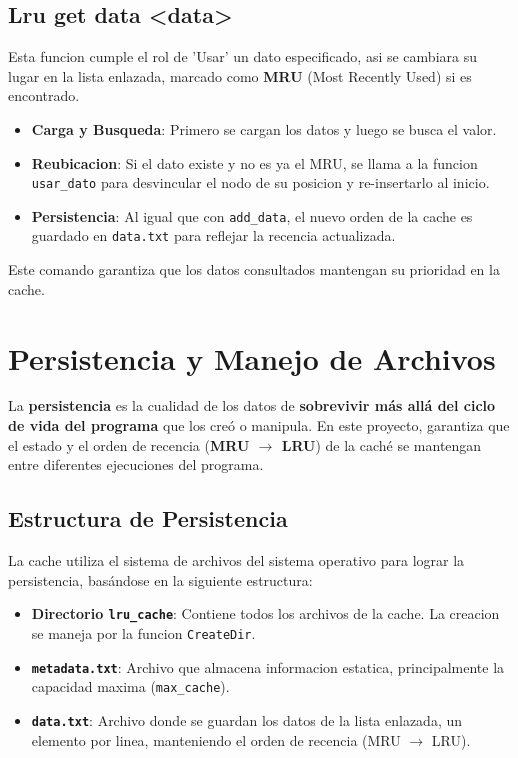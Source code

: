     \subsection{Lru get data \textless data\textgreater}
    Esta funcion cumple el rol de 'Usar' un dato especificado, asi se cambiara su lugar en la lista enlazada, marcado como \textbf{MRU} (Most Recently Used) si es encontrado. 
    \begin{itemize}
        \item \textbf{Carga y Busqueda}: Primero se cargan los datos y luego se busca el valor.
        \item \textbf{Reubicacion}: Si el dato existe y no es ya el MRU, se llama a la funcion \texttt{usar\_dato} para desvincular el nodo de su posicion y re-insertarlo al inicio.
        \item \textbf{Persistencia}: Al igual que con \texttt{add\_data}, el nuevo orden de la cache es guardado en \texttt{data.txt} para reflejar la recencia actualizada.
    \end{itemize}
    Este comando garantiza que los datos consultados mantengan su prioridad en la cache.
\newpage
\section{Persistencia y Manejo de Archivos}
    La \textbf{persistencia} es la cualidad de los datos de \textbf{sobrevivir más allá del ciclo de vida del programa} que los creó o manipula. En este proyecto, 
    garantiza que el estado y el orden de recencia (\textbf{MRU $\rightarrow$ LRU}) de la caché se mantengan entre diferentes ejecuciones del programa.
    \subsection{Estructura de Persistencia}
    La cache utiliza el sistema de archivos del sistema operativo para lograr la persistencia, basándose en la siguiente estructura:
    \begin{itemize}
        \item \textbf{Directorio \texttt{lru\_cache}}: Contiene todos los archivos de la cache. La creacion se maneja por la funcion \texttt{CreateDir}.
        \item \textbf{\texttt{metadata.txt}}: Archivo que almacena informacion estatica, principalmente la capacidad maxima (\texttt{max\_cache}).
        \item \textbf{\texttt{data.txt}}: Archivo donde se guardan los datos de la lista enlazada, un elemento por linea, manteniendo el orden de recencia (MRU $\rightarrow$ LRU).
    \end{itemize}


